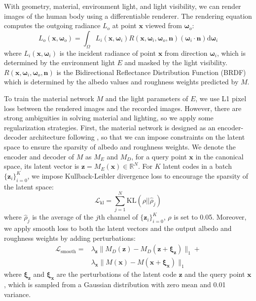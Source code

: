 With geometry, material, environment light, and light visibility, we can render images of the human body using a differentiable renderer.
The rendering equation computes the outgoing radiance $L_o$ at point $\mathbf{x}$ viewed from $\mathbf{\omega}_o$:
\begin{equation}
    L_o\left(\mathbf{x}, \mathbf{\omega}_o\right)=\int_{\Omega} L_{i }\left(\mathbf{x}, \mathbf{\omega}_i\right) R\left(\mathbf{x}, \mathbf{\omega}_i, \mathbf{\omega}_o, \mathbf{n}\right)\left(\mathbf{\omega}_i \cdot \mathbf{n}\right) \mathrm{d} \mathbf{\omega}_i
\end{equation}
where $L_{i}\left(\mathbf{x}, \mathbf{\omega}_i\right)$ is the incident radiance of point $\mathbf{x}$ from direction $\mathbf{\omega}_i$, which is determined by the environment light $E$ and masked by the light visibility. 
$R\left(\mathbf{x}, \mathbf{\omega}_i, \mathbf{\omega}_o, \mathbf{n}\right)$ is the Bidirectional Reflectance Distribution Function (BRDF) which is determined by the albedo values and roughness weights predicted by $M$. 

To train the material network $M$ and the light parameters of $E$, we use L1 pixel loss between the rendered images and the recorded images.
However, there are strong ambiguities in solving material and lighting, so we apply some regularization strategies.
First, the material network is designed as an encoder-decoder architecture following \cite{InvRender}, so that we can impose constraints on the latent space to ensure the sparsity of albedo and roughness weights. 
We denote the encoder and decoder of $M$ as $M_E$ and $M_D$, for a query point $\mathbf{x}$ in the canonical space, its latent vector is $\mathbf{z} = M_E(\mathbf{x}) \in \mathbb{R}^N$. 
For $K$ latent codes in a batch $\{\mathbf{z}_i\}_{i=0}^K$, we impose Kullback-Leibler divergence loss to encourage the sparsity of the latent space:
\begin{equation}
    \mathcal{L}_{\text{kl}} = \sum_{j=1}^N \mathrm{KL}\left(\rho || \hat{\rho}_j\right)
\end{equation}
where $\hat{\rho}_j$ is the average of the $j$th channel of $\{\mathbf{z}_i\}_{i=0}^K$, $\rho$ is set to 0.05.
Moreover, we apply smooth loss to both the latent vectors and the output albedo and roughness weights by adding perturbations:
\begin{equation}
\begin{aligned}
    \mathcal{L}_{\text{smooth}} = & \lambda_\mathbf{z} \|M_D(\mathbf{z}) - M_D(\mathbf{z} + \mathbf{\xi}_\mathbf{z})\|_1 + \\ 
    & \lambda_\mathbf{x} \| M(\mathbf{x}) - M(\mathbf{x} + \mathbf{\xi}_\mathbf{x})\|_1
\end{aligned}
\label{eq:lsmooth}
\end{equation}
where $\mathbf{\xi}_\mathbf{z}$ and $\mathbf{\xi}_\mathbf{x}$ are the perturbations of the latent code $\mathbf{z}$ and the query point $\mathbf{x}$, which is sampled from a Gaussian distribution with zero mean and 0.01 variance.

